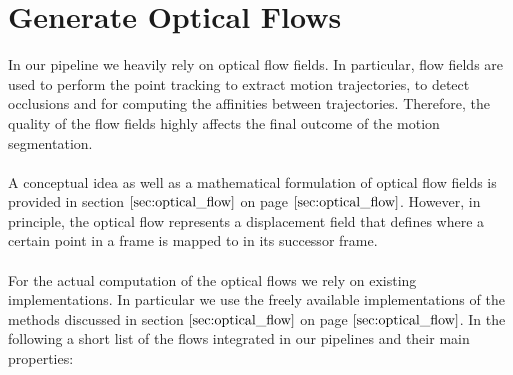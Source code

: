 \section{Generate Optical Flows}
In our pipeline we heavily rely on optical flow fields. In particular, flow fields are used to perform the point tracking to extract motion trajectories, to detect occlusions and for computing the affinities between trajectories. Therefore, the quality of the flow fields highly affects the final outcome of the motion segmentation. \\ \\
A conceptual idea as well as a mathematical formulation of optical flow fields is provided in section $\ref{sec:optical_flow}$ on page $\pageref{sec:optical_flow}$. However, in principle, the optical flow represents a displacement field that defines where a certain point in a frame is mapped to in its successor frame. \\ \\
For the actual computation of the optical flows we rely on existing implementations. In particular we use the freely available implementations of the methods discussed in section $\ref{sec:optical_flow}$ on page $\pageref{sec:optical_flow}$. In the following a short list of the flows integrated in our pipelines and their main properties:

